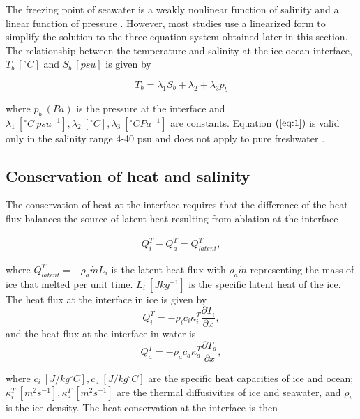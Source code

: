 \documentclass[11pt,a4paper]{article}
\begin{document}
    	The freezing point of seawater is a weakly nonlinear function of salinity and a linear function of pressure \citep{millero1978freezing}. %
    	However, most studies use a linearized form to simplify the solution to the three-equation system obtained later in this section. The relationship between the temperature and salinity at the ice-ocean interface, $T_b\ [^{\circ}C]$ and $S_b\ [psu]$ is given by
		
		\begin{equation}
			\label{eq:1}
			T_b = \lambda_1 S_b+\lambda_2+\lambda_3p_b
		\end{equation}
		
		\noindent where $p_b\ (Pa)$ is the pressure at the interface and $\lambda_1\ [^{\circ}C\ psu^{-1}],\lambda_2\ [^{\circ}C],\lambda_3\ [^{\circ}C Pa^{-1}]$ are constants. Equation $(\ref{eq:1})$ is valid only in the salinity range 4-40 psu and does not apply to pure freshwater \citep{holland1999modeling}.
		
		
		\subsection{Conservation of heat and salinity}
		
		The conservation of heat at the interface requires that the difference of the heat flux balances the source of latent heat resulting from ablation at the interface
		
		\begin{eqnarray}
			\label{eq:2}
			Q_i^T - Q_a^T = Q_{latent}^T,
		\end{eqnarray}
		
		\noindent where $Q_{latent}^T = -\rho_a\dot{m}L_i$ is the latent heat flux with $\rho_a\dot{m}$ representing the mass of ice that melted per unit time. $L_i\ [Jkg^{-1}]$ is the specific latent heat of the ice. The heat flux at the interface in ice is given by $$Q_i^T = -\rho_i c_i\kappa_i^T\dfrac{\partial T_i}{\partial x},$$ and the heat flux at the interface in water is $$ Q_a^T = -\rho_a c_a\kappa_a^T\dfrac{\partial T_a}{\partial x},$$ 
		
		\noindent where $c_i\ [J /kg ^{\circ}C], c_a\ [J /kg ^{\circ} C]$ are the specific heat capacities of ice and ocean; $\kappa_i^T\ [m^2s^{-1}], \kappa_a^T\ [m^2s^{-1}]$ are the thermal diffusivities of ice and seawater, and $\rho_i$ is the ice density. The heat conservation at the interface is then
		
\end{document}

